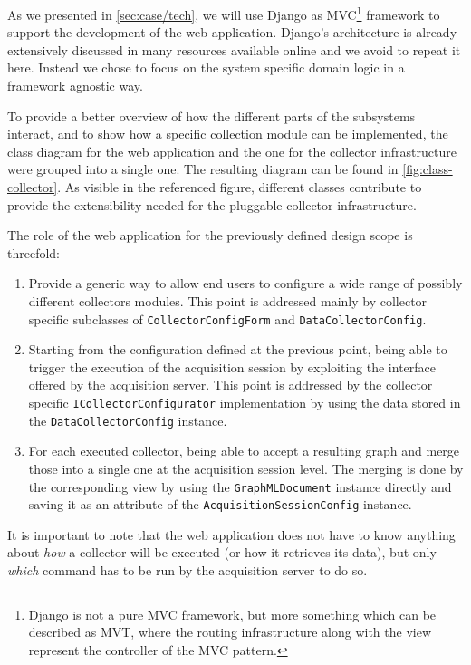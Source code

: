 As we presented in \vref{sec:case/tech}, we will use Django as MVC\footnote{Django is not a pure MVC framework, but more something which can be described as MVT, where the routing infrastructure along with the view represent the controller of the MVC pattern.} framework to support the development of the web application. Django's architecture is already extensively discussed in many resources available online and we avoid to repeat it here. Instead we chose to focus on the system specific domain logic in a framework agnostic way.

To provide a better overview of how the different parts of the subsystems interact, and to show how a specific collection module can be implemented, the class diagram for the web application and the one for the collector infrastructure were grouped into a single one. The resulting diagram can be found in \vref{fig:class-collector}. As visible in the referenced figure, different classes contribute to provide the extensibility needed for the pluggable collector infrastructure.

The role of the web application for the previously defined design scope is threefold:
\begin{enumerate}
  \item Provide a generic way to allow end users to configure a wide range of possibly different collectors modules. This point is addressed mainly by collector specific subclasses of \texttt{CollectorConfigForm} and \texttt{DataCollectorConfig}.
  \item Starting from the configuration defined at the previous point, being able to trigger the execution of the acquisition session by exploiting the interface offered by the acquisition server. This point is addressed by the collector specific \texttt{ICollectorConfigurator} implementation by using the data stored in the \texttt{DataCollectorConfig} instance.
  \item For each executed collector, being able to accept a resulting graph and merge those into a single one at the acquisition session level. The merging is done by the corresponding view by using the \texttt{GraphMLDocument} instance directly and saving it as an attribute of the \texttt{AcquisitionSessionConfig} instance.
\end{enumerate}
It is important to note that the web application does not have to know anything about \emph{how} a collector will be executed (or how it retrieves its data), but only \emph{which} command has to be run by the acquisition server to do so.

